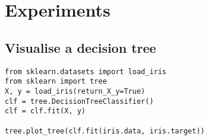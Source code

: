 \documentclass[11pt]{article}
\begin{document}
\section{Experiments}
\label{sec:org24e9fc6}

\subsection{Visualise a decision tree}
\label{sec:org59b9aa3}

\begin{verbatim}
from sklearn.datasets import load_iris
from sklearn import tree
X, y = load_iris(return_X_y=True)
clf = tree.DecisionTreeClassifier()
clf = clf.fit(X, y)

tree.plot_tree(clf.fit(iris.data, iris.target))
\end{verbatim}
\end{document}
